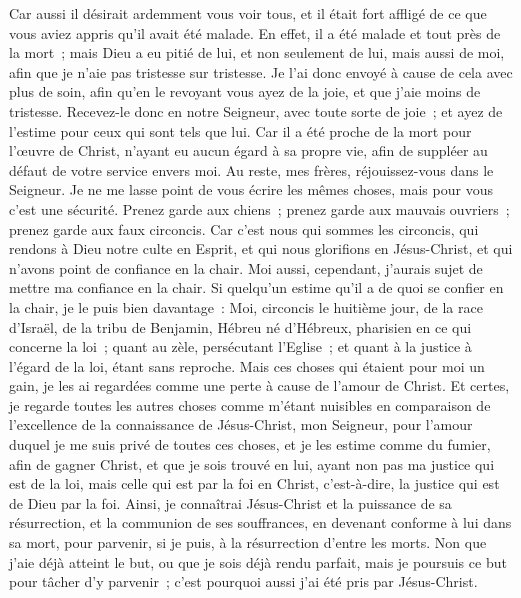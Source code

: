 \begin{multicols}{2}
Car aussi il désirait ardemment vous voir tous, et il était fort affligé de ce que vous aviez appris qu'il avait été malade.
En effet, il a été malade et tout près de la mort~; mais Dieu a eu pitié de lui, et non seulement de lui, mais aussi de moi, afin que je n'aie pas tristesse sur tristesse.
Je l'ai donc envoyé à cause de cela avec plus de soin, afin qu'en le revoyant vous ayez de la joie, et que j'aie moins de tristesse.
Recevez-le donc en notre Seigneur, avec toute sorte de joie~; et ayez de l'estime pour ceux qui sont tels que lui. 
Car il a été proche de la mort pour l'œuvre de Christ, n'ayant eu aucun égard à sa propre vie, afin de suppléer au défaut de votre service envers moi.
\VerseOne{}Au reste, mes frères, réjouissez-vous dans le Seigneur. Je ne me lasse point de vous écrire les mêmes choses, mais pour vous c'est une sécurité.
Prenez garde aux chiens~; prenez garde aux mauvais ouvriers~; prenez garde aux faux circoncis.
Car c'est nous qui sommes les circoncis, qui rendons à Dieu notre culte en Esprit, et qui nous glorifions en Jésus-Christ, et qui n'avons point de confiance en la chair.
Moi aussi, cependant, j'aurais sujet de mettre ma confiance en la chair. Si quelqu'un estime qu'il a de quoi se confier en la chair, je le puis bien davantage~:
Moi, circoncis le huitième jour, de la race d'Israël, de la tribu de Benjamin, Hébreu né d'Hébreux, pharisien en ce qui concerne la loi~;
quant au zèle, persécutant l'Eglise~; et quant à la justice à l'égard de la loi, étant sans reproche.
Mais ces choses qui étaient pour moi un gain, je les ai regardées comme une perte à cause de l'amour de Christ.
Et certes, je regarde toutes les autres choses comme m'étant nuisibles en comparaison de l'excellence de la connaissance de Jésus-Christ, mon Seigneur, pour l'amour duquel je me suis privé de toutes ces choses, et je les estime comme du fumier, afin de gagner Christ,
et que je sois trouvé en lui, ayant non pas ma justice qui est de la loi, mais celle qui est par la foi en Christ, c'est-à-dire, la justice qui est de Dieu par la foi.
Ainsi, je connaîtrai Jésus-Christ et la puissance de sa résurrection, et la communion de ses souffrances, en devenant conforme à lui dans sa mort, pour parvenir,
si je puis, à la résurrection d'entre les morts.
Non que j'aie déjà atteint le but, ou que je sois déjà rendu parfait, mais je poursuis ce but pour tâcher d'y parvenir~; c'est pourquoi aussi j'ai été pris par Jésus-Christ.

\end{multicols}
